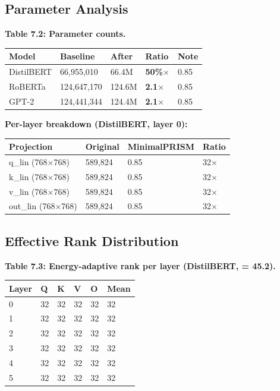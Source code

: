 \subsection{Parameter Analysis}

\textbf{Table 7.2: Parameter counts.}

\begin{table}[H]
\centering
\small
\begin{tabular}{lllll}
\toprule
\textbf{Model} & \textbf{Baseline} & \textbf{After} & \textbf{Ratio} & \textbf{Note} \\
\midrule
DistilBERT & 66,955,010 & 66.4M & \textbf{50\%$\times$} & 0.85 \\
RoBERTa & 124,647,170 & 124.6M & \textbf{2.1$\times$} & 0.85 \\
GPT-2 & 124,441,344 & 124.4M & \textbf{2.1$\times$} & 0.85 \\
\bottomrule
\end{tabular}
\end{table}

\textbf{Per-layer breakdown (DistilBERT, layer 0):}

\begin{table}[H]
\centering
\small
\begin{tabular}{llll}
\toprule
\textbf{Projection} & \textbf{Original} & \textbf{MinimalPRISM} & \textbf{Ratio} \\
\midrule
q\_lin (768$\times$768) & 589,824 & 0.85 & 32$\times$ \\
k\_lin (768$\times$768) & 589,824 & 0.85 & 32$\times$ \\
v\_lin (768$\times$768) & 589,824 & 0.85 & 32$\times$ \\
out\_lin (768$\times$768) & 589,824 & 0.85 & 32$\times$ \\
\bottomrule
\end{tabular}
\end{table}

\subsection{Effective Rank Distribution}

\textbf{Table 7.3: Energy-adaptive rank per layer (DistilBERT,   = 45.2).}

\begin{table}[H]
\centering
\small
\begin{tabular}{llllll}
\toprule
\textbf{Layer} & \textbf{Q} & \textbf{K} & \textbf{V} & \textbf{O} & \textbf{Mean} \\
\midrule
0 & 32 & 32 & 32 & 32 & 32 \\
1 & 32 & 32 & 32 & 32 & 32 \\
2 & 32 & 32 & 32 & 32 & 32 \\
3 & 32 & 32 & 32 & 32 & 32 \\
4 & 32 & 32 & 32 & 32 & 32 \\
5 & 32 & 32 & 32 & 32 & 32 \\
\bottomrule
\end{tabular}
\end{table}

